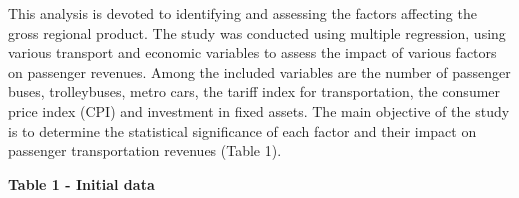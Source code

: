 This analysis is devoted to identifying and assessing the factors
affecting the gross regional product. The study was conducted using
multiple regression, using various transport and economic variables to
assess the impact of various factors on passenger revenues. Among the
included variables are the number of passenger buses, trolleybuses,
metro cars, the tariff index for transportation, the consumer price
index (CPI) and investment in fixed assets. The main objective of the
study is to determine the statistical significance of each factor and
their impact on passenger transportation revenues (Table 1).

{\bfseries Table 1 - Initial data}


